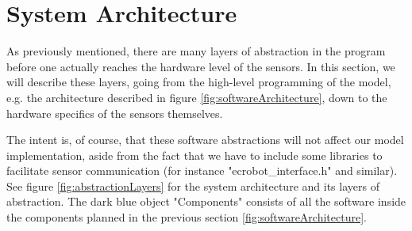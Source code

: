\section{System Architecture}


As previously mentioned, there are many layers of abstraction in the program before one actually reaches the hardware level of the sensors. In this section, we will describe these layers, going from the high-level programming of the model, e.g. the architecture described in figure \ref{fig:softwareArchitecture}, down to the hardware specifics of the sensors themselves. 

The intent is, of course, that these software abstractions will not affect our model implementation, aside from the fact that we have to include some libraries to facilitate sensor communication (for instance "ecrobot\_interface.h" and similar). See figure \ref{fig:abstractionLayers} for the system architecture and its layers of abstraction. The dark blue object "Components" consists of all the software inside the components planned in the previous section \ref{fig:softwareArchitecture}. 

